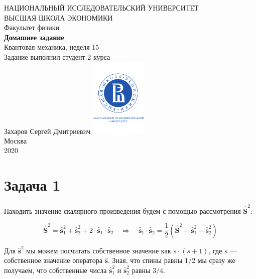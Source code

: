 \documentclass[a4paper, 12pt]{article}
\newcommand{\qrq}
{\ensuremath{\quad \Rightarrow \quad}} %
\begin{document}
	\begin{titlepage}
		\begin{center}
			$$$$
			$$$$
			$$$$
			$$$$
			{\Large{НАЦИОНАЛЬНЫЙ ИССЛЕДОВАТЕЛЬСКИЙ УНИВЕРСИТЕТ}}\\
			\vspace{0.1cm}
			{\Large{ВЫСШАЯ ШКОЛА ЭКОНОМИКИ}}\\
			\vspace{0.25cm}
			{\large{Факультет физики}}\\
			\vspace{5.5cm}
			{\Huge\textbf{{Домашнее задание}}}\\%
			\vspace{1cm}
			{\LARGE{Квантовая механика, неделя 15}}\\%
			\vspace{2cm}
			{Задание выполнил студент 2 курса}\\
			{Захаров Сергей Дмитриевич}
			\vfill
			\includegraphics[width = 0.2\textwidth]{HSElogo}\\
			\vfill
			Москва\\
			2020
		\end{center}
	\end{titlepage}

\section*{Задача 1}

Находить значение скалярного произведения будем с помощью рассмотрения $\hat{\mathbf{S}}^2$:

\begin{equation}
	\hat{\mathbf{S}}^2 = \hat{\mathbf{s}}_1^2 + \hat{\mathbf{s}}_2^2 + 2 \cdot  \hat{\mathbf{s}}_1 \cdot \hat{\mathbf{s}}_2 \qrq \hat{\mathbf{s}}_1 \cdot \hat{\mathbf{s}}_2 = \frac{1}{2} \left(\hat{\mathbf{S}}^2 - \hat{\mathbf{s}}_1^2 - \hat{\mathbf{s}}_2^2\right)
	\label{eq:t1_result}
\end{equation}

Для $\hat{\mathbf{s}}^2$ мы можем посчитать собственное значение как $s \cdot (s + 1)$, где $s$ --- собственное значение оператора $\hat{\mathbf{s}}$. Зная, что спины равны $1/2$  мы сразу же получаем, что собственные числа $\hat{\mathbf{s}}_1^2$ и $\hat{\mathbf{s}}_2^2$ равны $3/4$. 
\end{document}
